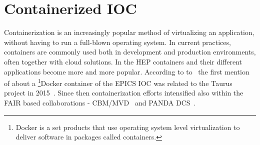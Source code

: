 \section{Containerized IOC}
Containerization is an increasingly popular method of virtualizing an application, without having to run a full-blown operating system. In current practices, containers are commonly used both in development and production environments, often together with cloud solutions. In the \gls{HEP} containers and their different applications become more and more popular. According to to~\cite{Klaus2021} the first mention of about a \footnote{Docker is a set products that use operating system level virtualization to deliver software in packages called containers.}{Docker} container of the \gls{EPICS} \gls{IOC} was related to the Taurus project in 2015~\cite{taurus}. Since then containerization efforts intensified also within the \gls{FAIR} based collaborations - \gls{CBM}/\gls{MVD}~\cite{Klaus2021} and PANDA DCS~\cite{PANDA_1}.

